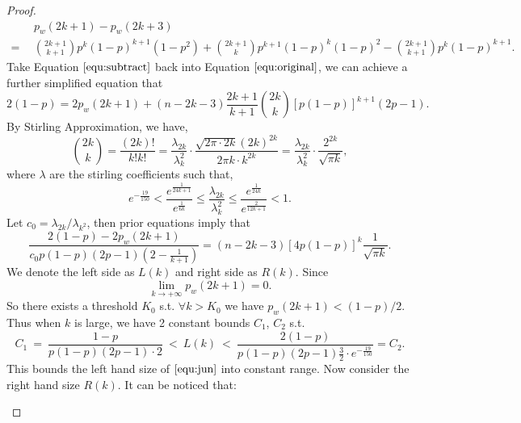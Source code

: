 \documentclass[a4paper,UKenglish]{lipics}
\theoremstyle{definition}
\begin{document}
\begin{proof}
\begin{equation}
\label{equ:subtract}
\begin{aligned}
& ~~
	p_w(2k+1) - p_w(2k+3)
\\ 
= &~~
	\binom{2k+1}{k+1}p^k(1-p)^{k+1}(1-p^2) 
	+\binom{2k+1}{k} p^{k+1}(1-p)^k(1-p)^2 
	-\binom{2k+1}{k+1} p^k(1-p)^{k+1}.
\end{aligned}
\end{equation}
Take Equation $\ref{equ:subtract}$ back into Equation $\ref{equ:original}$, we can achieve a further simplified equation that
\begin{equation*}
	2(1 - p)
 =
	2 p_w(2k+1) +
	(n-2k-3)\frac{2k+1}{k+1}\binom{2k}{k}\left[p(1-p)\right]^{k+1}(2p-1).
\end{equation*}
By Stirling Approximation, we have,
\begin{equation*}
	\binom{2k}{k} 
= 
	\frac{(2k)!}{k!k!} 
= 
	\frac{\lambda_{2k}}{\lambda_k^2}\cdot \frac{\sqrt{2\pi \cdot 2k}(2k)^{2k}}{2\pi k \cdot k^{2k}} 
= 
	\frac{\lambda_{2k}}{\lambda_k^2}\cdot \frac{2^{2k}}{\sqrt{\pi k}},
\end{equation*}
where $\lambda$ are the stirling coefficients such that,
\begin{equation*}
	e^{-\frac{19}{150}} 
< 
	\frac{e^\frac{1}{24k+1}}{e^\frac{1}{6k}} 
\leq  
	\frac{\lambda_{2k}}{\lambda_k^2} 
\leq 
	\frac{e^\frac{1}{24k}}{e^\frac{2}{12k+1}} 
< 
	1.
\end{equation*}
Let $c_0 = \lambda_{2k} / \lambda_{k^2}$, then prior equations imply that
\begin{equation}
\label{equ:jun}
	\frac{2(1-p)-2p_w(2k+1)}{c_0p(1-p)(2p-1)(2-\frac{1}{k+1})} 
= 
	(n-2k-3)[4p(1-p)]^k \frac{1}{\sqrt{\pi k}}.
\end{equation}
We denote the left side as $L(k)$ and right side as $R(k)$. Since 
\begin{equation*}
	\lim_{k\to +\infty} p_w(2k+1) 
=
	0.
\end{equation*}
So there exists a threshold $K_0$ s.t. $ \forall k > K_0 $ we have $p_w(2k+1) < (1-p)/2$. 
Thus when $k$ is large, we have 2 constant bounds $ C_1 $, $ C_2 $ s.t.
\begin{equation}
\label{equ:bound of equation}
	C_1 
~=~
	\frac{1-p}{p(1-p)(2p-1)\cdot 2} 
~<~ 
	L(k)
~<~ 
	\frac{2(1-p)}{p(1-p)(2p-1)\frac{3}{2}\cdot e^{-\frac{19}{150}}} 
= 
	C_2.
\end{equation}
This bounds the left hand size of $\ref{equ:jun}$ into constant range.
Now consider the right hand size $R(k)$.
It can be noticed that:
\begin{itemize}

\end{itemize}
\end{proof}
\end{document}
